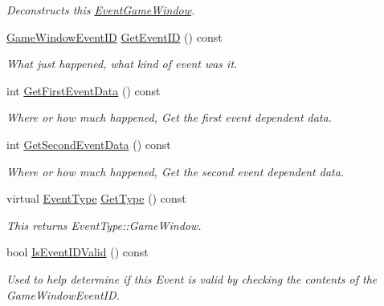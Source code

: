\begin{DoxyCompactItemize}
\begin{DoxyCompactList}\small\item\em Deconstructs this \hyperlink{classMezzanine_1_1EventGameWindow}{EventGameWindow}. \item\end{DoxyCompactList}\item 
\hyperlink{classMezzanine_1_1EventGameWindow_a0f0ff29853317334f018bcf48d502af2}{GameWindowEventID} \hyperlink{classMezzanine_1_1EventGameWindow_ace6bd54e020a18818027cdfc88970e81}{GetEventID} () const 
\begin{DoxyCompactList}\small\item\em What just happened, what kind of event was it. \item\end{DoxyCompactList}\item 
int \hyperlink{classMezzanine_1_1EventGameWindow_aff42c9bc5c487536e2101547da8162e8}{GetFirstEventData} () const 
\begin{DoxyCompactList}\small\item\em Where or how much happened, Get the first event dependent data. \item\end{DoxyCompactList}\item 
int \hyperlink{classMezzanine_1_1EventGameWindow_afeb55f7d4cc99a8c0539fdb02feaea03}{GetSecondEventData} () const 
\begin{DoxyCompactList}\small\item\em Where or how much happened, Get the second event dependent data. \item\end{DoxyCompactList}\item 
virtual \hyperlink{classMezzanine_1_1EventBase_ab85e31e97753b7e7ecb098f82526baef}{EventType} \hyperlink{classMezzanine_1_1EventGameWindow_a6658ffa68d0d39e2718214fb7a7da3d7}{GetType} () const 
\begin{DoxyCompactList}\small\item\em This returns EventType::GameWindow. \item\end{DoxyCompactList}\item 
bool \hyperlink{classMezzanine_1_1EventGameWindow_ab51a632acaf07f9a46817467ca54efca}{IsEventIDValid} () const 
\begin{DoxyCompactList}\small\item\em Used to help determine if this Event is valid by checking the contents of the GameWindowEventID. \item\end{DoxyCompactList}\item 

\end{DoxyCompactItemize}
